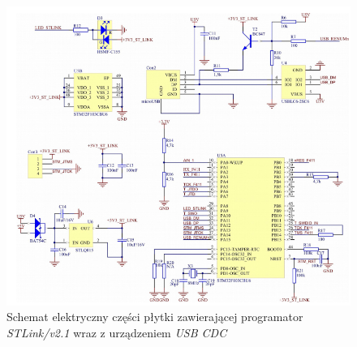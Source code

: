 \begin{figure}[h!]
    \centering 
    \includegraphics[scale=0.65]{pl/media/f411_stlink.png}
    \caption{Schemat elektryczny części płytki \cite{NUCLEO} zawierającej programator \textit{STLink/v2.1} 
    wraz z urządzeniem \textit{USB CDC}}
    \label{fig:f411_stlink}
\end{figure}

